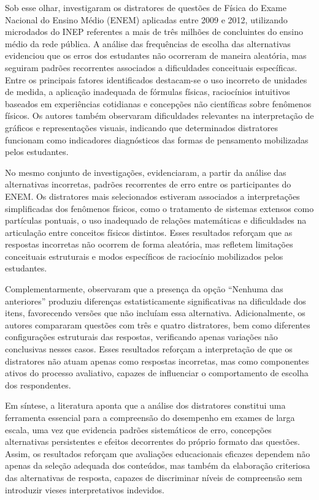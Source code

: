 \documentclass[a4paper,10pt, twocolumn]{article}
\begin{document}
Sob esse olhar, \textcite{Marcom2016} investigaram os distratores de questões de Física do Exame Nacional do Ensino Médio (ENEM) aplicadas entre 2009 e 2012, utilizando microdados do INEP referentes a mais de três milhões de concluintes do ensino médio da rede pública. A análise das frequências de escolha das alternativas evidenciou que os erros dos estudantes não ocorreram de maneira aleatória, mas seguiram padrões recorrentes associados a dificuldades conceituais específicas. Entre os principais fatores identificados destacam-se o uso incorreto de unidades de medida, a aplicação inadequada de fórmulas físicas, raciocínios intuitivos baseados em experiências cotidianas e concepções não científicas sobre fenômenos físicos. Os autores também observaram dificuldades relevantes na interpretação de gráficos e representações visuais, indicando que determinados distratores funcionam como indicadores diagnósticos das formas de pensamento mobilizadas pelos estudantes.

No mesmo conjunto de investigações, \textcite{lopes2015estudo} evidenciaram, a partir da análise das alternativas incorretas, padrões recorrentes de erro entre os participantes do ENEM. Os distratores mais selecionados estiveram associados a interpretações simplificadas dos fenômenos físicos, como o tratamento de sistemas extensos como partículas pontuais, o uso inadequado de relações matemáticas e dificuldades na articulação entre conceitos físicos distintos. Esses resultados reforçam que as respostas incorretas não ocorrem de forma aleatória, mas refletem limitações conceituais estruturais e modos específicos de raciocínio mobilizados pelos estudantes.

Complementarmente,\textcite{Caldwell2013}  observaram que a presença da opção “Nenhuma das anteriores” produziu diferenças estatisticamente significativas na dificuldade dos itens, favorecendo versões que não incluíam essa alternativa. Adicionalmente, os autores compararam questões com três e quatro distratores, bem como diferentes configurações estruturais das respostas, verificando apenas variações não conclusivas nesses casos. Esses resultados reforçam a interpretação de que os distratores não atuam apenas como respostas incorretas, mas como componentes ativos do processo avaliativo, capazes de influenciar o comportamento de escolha dos respondentes.

Em síntese, a literatura aponta que a análise dos distratores constitui uma ferramenta essencial para a compreensão do desempenho em exames de larga escala, uma vez que evidencia padrões sistemáticos de erro, concepções alternativas persistentes e efeitos decorrentes do próprio formato das questões. Assim, os resultados reforçam que avaliações educacionais eficazes dependem não apenas da seleção adequada dos conteúdos, mas também da elaboração criteriosa das alternativas de resposta, capazes de discriminar níveis de compreensão sem introduzir vieses interpretativos indevidos.
\end{document}
